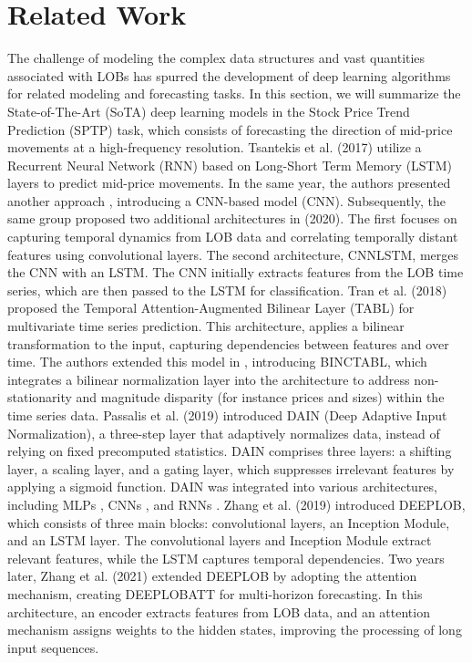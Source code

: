 \section{Related Work}
The challenge of modeling the complex data structures and vast quantities associated with LOBs has spurred the development of deep learning algorithms for related modeling and forecasting tasks.
In this section, we will summarize the State-of-The-Art (SoTA) deep learning models in the Stock Price Trend Prediction (SPTP) task, which consists of forecasting the direction of mid-price movements at a high-frequency resolution. 
Tsantekis et al.\cite{tsantekidis2017using} (2017) utilize a Recurrent Neural Network (RNN) based on Long-Short Term Memory (LSTM) layers to predict mid-price movements. In the same year, the authors presented another approach \cite{tsantekidis2017forecasting}, introducing a CNN-based model (CNN). Subsequently, the same group proposed two additional architectures in \cite{tsantekidis2020using} (2020). The first focuses on capturing temporal dynamics from LOB data and correlating temporally distant features using convolutional layers. The second architecture, CNNLSTM, merges the CNN with an LSTM. The CNN initially extracts features from the LOB time series, which are then passed to the LSTM for classification.
Tran et al.\cite{tran2018temporal} (2018) proposed the Temporal Attention-Augmented Bilinear Layer (TABL) for multivariate time series prediction. This architecture, applies a bilinear transformation to the input, capturing dependencies between features and over time. The authors extended this model in \cite{tran2021data}, introducing BINCTABL, which integrates a bilinear normalization layer into the architecture to address non-stationarity and magnitude disparity (for instance prices and sizes) within the time series data. 
Passalis et al.\cite{passalis2019deep} (2019) introduced DAIN (Deep Adaptive Input Normalization), a three-step layer that adaptively normalizes data, instead of relying on fixed precomputed statistics. DAIN comprises three layers: a shifting layer, a scaling layer, and a gating layer, which suppresses irrelevant features by applying a sigmoid function. DAIN was integrated into various architectures, including MLPs \cite{nousi2019machine}, CNNs \cite{tsantekidis2017forecasting}, and RNNs \cite{cho2014learning}. 
Zhang et al. \cite{zhang2019deeplob} (2019) introduced DEEPLOB, which consists of three main blocks: convolutional layers, an Inception Module, and an LSTM layer. The convolutional layers and Inception Module extract relevant features, while the LSTM captures temporal dependencies. Two years later, Zhang et al.\cite{zhang2021multihorizonforecastinglimitorder} (2021) extended DEEPLOB by adopting the attention \cite{luong2015effective} mechanism, creating DEEPLOBATT for multi-horizon forecasting. In this architecture, an encoder extracts features from LOB data, and an attention mechanism assigns weights to the hidden states, improving the processing of long input sequences.
